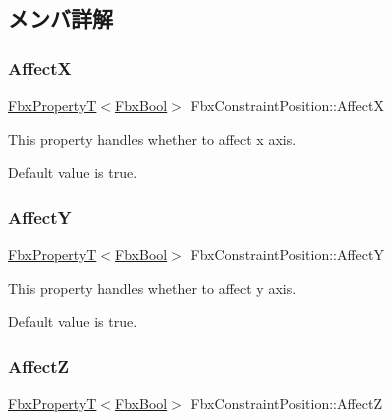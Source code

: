 \subsection{メンバ詳解}
\mbox{\label{class_fbx_constraint_position_a2488e70c6bd35dd13cafa4234a21ca5c}} 
\subsubsection{\texorpdfstring{AffectX}{AffectX}}
{\footnotesize\ttfamily \hyperlink{class_fbx_property_t}{Fbx\+PropertyT}$<$\hyperlink{fbxtypes_8h_a92e0562b2fe33e76a242f498b362262e}{Fbx\+Bool}$>$ Fbx\+Constraint\+Position\+::\+AffectX}

This property handles whether to affect x axis.

Default value is true. \mbox{\label{class_fbx_constraint_position_afa5910286c656a2e87398645e3e3114d}} 
\subsubsection{\texorpdfstring{AffectY}{AffectY}}
{\footnotesize\ttfamily \hyperlink{class_fbx_property_t}{Fbx\+PropertyT}$<$\hyperlink{fbxtypes_8h_a92e0562b2fe33e76a242f498b362262e}{Fbx\+Bool}$>$ Fbx\+Constraint\+Position\+::\+AffectY}

This property handles whether to affect y axis.

Default value is true. \mbox{\label{class_fbx_constraint_position_a4d99852028aff66edc99d669d2f1bbae}} 
\subsubsection{\texorpdfstring{AffectZ}{AffectZ}}
{\footnotesize\ttfamily \hyperlink{class_fbx_property_t}{Fbx\+PropertyT}$<$\hyperlink{fbxtypes_8h_a92e0562b2fe33e76a242f498b362262e}{Fbx\+Bool}$>$ Fbx\+Constraint\+Position\+::\+AffectZ}

